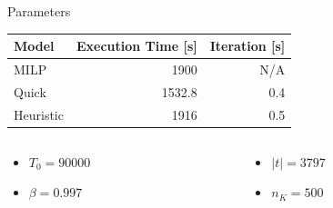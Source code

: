 \documentclass[aspectratio=169]{beamer}
\begin{document}
\begin{frame}[label={sec:org146e6df}]{Parameters}
\begin{center}
\begin{tabular}{lrr}
\alert{Model} & \alert{Execution Time} [s] & \alert{Iteration} [s]\\[0pt]
\hline
MILP & 1900 & N/A\\[0pt]
Quick & 1532.8 & 0.4\\[0pt]
Heuristic & 1916 & 0.5\\[0pt]
\end{tabular}
\end{center}

\begin{columns}
\begin{column}{0.5\columnwidth}
\begin{itemize}
\item \(T_0 = 90000\)
\item \(\beta = 0.997\)
\end{itemize}
\end{column}
\begin{column}{0.5\columnwidth}
\begin{itemize}
\item \(|t| = 3797\)
\item \(n_K = 500\)
\end{itemize}
\end{column}
\end{columns}
\end{frame}
\end{document}
